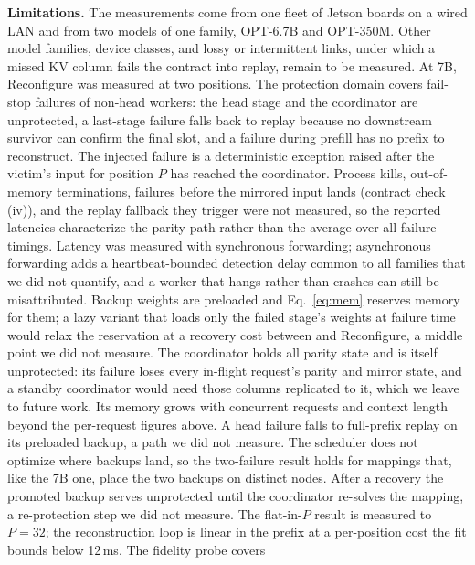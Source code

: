 \textbf{Limitations.}  The measurements come from one fleet of Jetson boards
on a wired LAN and from two models of one family, OPT-6.7B and OPT-350M.  Other model families, device classes, and lossy or intermittent links, under
which a missed KV column fails the contract into replay, remain to be
measured.  At 7B, Reconfigure was
measured at two positions.  The protection domain covers
fail-stop failures of non-head workers: the head stage and the coordinator
are unprotected, a last-stage failure falls back to replay because no
downstream survivor can confirm the final slot, and a failure during prefill
has no prefix to reconstruct.  The injected failure is a deterministic exception raised after the victim's
input for position $P$ has reached the coordinator.  Process kills,
out-of-memory terminations, failures before the mirrored input lands
(contract check (iv)), and the replay fallback they trigger were not
measured, so the reported latencies characterize the parity path rather than
the average over all failure timings.  Latency was measured with
synchronous forwarding; asynchronous forwarding adds a heartbeat-bounded
detection delay common to all families that we did not quantify, and a
worker that hangs rather than crashes can still be misattributed.  Backup weights are preloaded and Eq.~\ref{eq:mem} reserves memory for them;
a lazy variant that loads only the failed stage's weights at failure time
would relax the reservation at a recovery cost between \sys{} and
Reconfigure, a middle point we did not measure.  The coordinator holds all
parity state and is itself unprotected: its failure loses every in-flight
request's parity and mirror state, and a standby coordinator would need those
columns replicated to it, which we leave to future work.  Its memory grows
with concurrent requests and context length beyond the per-request figures
above.  A head failure falls to full-prefix replay on its preloaded backup, a
path we did not measure.  The
scheduler does not optimize where backups land, so the two-failure result
holds for mappings that, like the 7B one, place the two backups on distinct
nodes.  After a recovery the promoted backup serves unprotected until the
coordinator re-solves the mapping, a re-protection step we did not measure.
The flat-in-$P$ result is measured to $P=32$; the reconstruction loop is
linear in the prefix at a per-position cost the fit bounds below 12\,ms.  The fidelity probe covers
